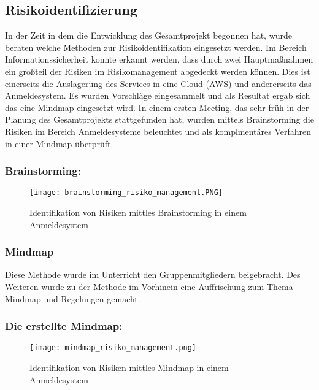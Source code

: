 \subsection{Risikoidentifizierung}
In der Zeit in dem die Entwicklung des Gesamtprojekt begonnen hat, wurde beraten welche Methoden zur Risikoidentifikation eingesetzt werden. Im Bereich Informationssicherheit konnte erkannt werden, dass durch zwei Hauptmaßnahmen ein großteil der Risiken im Risikomanagement abgedeckt werden können. Dies ist einerseits die Auslagerung des Services in eine Cloud (AWS) und andererseits das Anmeldesystem. Es wurden Vorschläge eingesammelt und als Resultat ergab sich das eine Mindmap eingesetzt wird.
In einem ersten Meeting, das sehr früh in der Planung des Gesamtprojekts stattgefunden hat, wurden mittels Brainstorming die Risiken im Bereich Anmeldesysteme beleuchtet und als komplmentäres Verfahren in einer Mindmap überprüft.

\subsubsection{Brainstorming:}
\begin{center}
\begin{figure}[H]
    \centering
    \texttt{[image: brainstorming\_risiko\_management.PNG]}
    \caption{Identifikation von Risiken mittles Brainstorming in einem Anmeldesystem}
\end{figure}
\end{center}

\subsubsection{Mindmap}
Diese Methode wurde im Unterricht den Gruppenmitgliedern beigebracht. Des Weiteren wurde zu der Methode im Vorhinein eine Auffrischung zum Thema Mindmap und Regelungen gemacht.

\subsubsection{Die erstellte Mindmap:}
\begin{center}
\begin{figure}[H]
    \centering
    \texttt{[image: mindmap\_risiko\_management.png]}
    \caption{Identifikation von Risiken mittles Mindmap in einem Anmeldesystem}
\end{figure}
\end{center}

